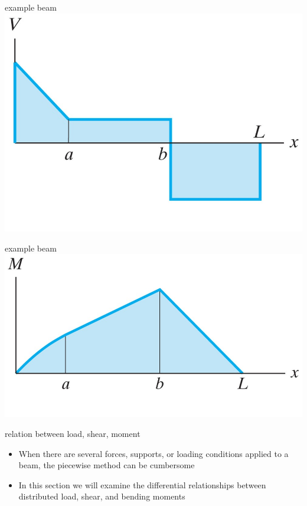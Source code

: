\begin{frame}{example beam}
\protect\hypertarget{example-beam-1}{}
\includegraphics{../images/shear-diagram.jpg}
\end{frame}

\begin{frame}{example beam}
\protect\hypertarget{example-beam-2}{}
\includegraphics{../images/moment-diagram.jpg}
\end{frame}

\begin{frame}{relation between load, shear, moment}
\protect\hypertarget{relation-between-load-shear-moment}{}
\begin{itemize}
\tightlist
\item
  When there are several forces, supports, or loading conditions applied
  to a beam, the piecewise method can be cumbersome
\item
  In this section we will examine the differential relationships between
  distributed load, shear, and bending moments
\end{itemize}
\end{frame}

